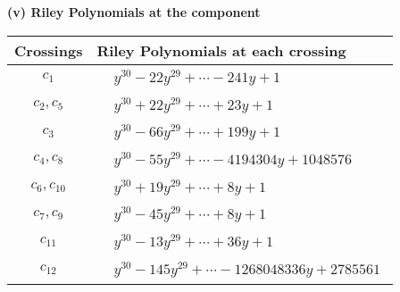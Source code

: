 \documentclass[1p]{elsarticle_modified}
\theoremstyle{definition}
\begin{document}
\newpage\renewcommand{\arraystretch}{1}
\flushleft \textbf{(v) Riley Polynomials at the component}\newline \\
\begin{tabular}{m{50pt}|m{274pt}}
Crossings & \hspace{64pt}Riley Polynomials at each crossing \\
\hline $$\begin{aligned}c_{1}\end{aligned}$$&$\begin{aligned}
&y^{30}-22 y^{29}+\cdots-241 y+1
\end{aligned}$\\
\hline $$\begin{aligned}c_{2},c_{5}\end{aligned}$$&$\begin{aligned}
&y^{30}+22 y^{29}+\cdots+23 y+1
\end{aligned}$\\
\hline $$\begin{aligned}c_{3}\end{aligned}$$&$\begin{aligned}
&y^{30}-66 y^{29}+\cdots+199 y+1
\end{aligned}$\\
\hline $$\begin{aligned}c_{4},c_{8}\end{aligned}$$&$\begin{aligned}
&y^{30}-55 y^{29}+\cdots-4194304 y+1048576
\end{aligned}$\\
\hline $$\begin{aligned}c_{6},c_{10}\end{aligned}$$&$\begin{aligned}
&y^{30}+19 y^{29}+\cdots+8 y+1
\end{aligned}$\\
\hline $$\begin{aligned}c_{7},c_{9}\end{aligned}$$&$\begin{aligned}
&y^{30}-45 y^{29}+\cdots+8 y+1
\end{aligned}$\\
\hline $$\begin{aligned}c_{11}\end{aligned}$$&$\begin{aligned}
&y^{30}-13 y^{29}+\cdots+36 y+1
\end{aligned}$\\
\hline $$\begin{aligned}c_{12}\end{aligned}$$&$\begin{aligned}
&y^{30}-145 y^{29}+\cdots-1268048336 y+2785561
\end{aligned}$\\
\hline
\end{tabular}\\~\\
\end{document}
